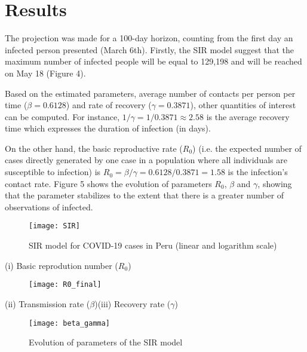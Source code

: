 \documentclass[12pt]{article}
\begin{document}
\section{Results}

The projection was made for a 100-day horizon, counting from the first day an infected person presented (March 6th). Firstly, the SIR model suggest that the maximum number of infected people will be equal to 129,198 and will be reached on May 18 (Figure 4).

Based on the estimated parameters, average number of contacts per person per time ($\beta=0.6128$) and  rate of recovery ($\gamma = 0.3871$), other quantities of interest can be computed. For instance, $1/\gamma = 1/0.3871 \approx  2.58$ is the average recovery time which expresses the duration of infection (in days). 

On the other hand, the basic reproductive rate ($R_0$) (i.e. the expected number of cases directly generated by one case in a population where all individuals are susceptible to infection) is $R_0=\beta/\gamma=0.6128/0.3871= 1.58$ is the infection’s contact rate. Figure 5 shows the evolution of parameters $R_0$, $\beta$ and $\gamma$, showing that the parameter stabilizes to the extent that there is a greater number of observations of infected.
\vspace{5mm}

\begin{figure}[h]
\centering
\texttt{[image: SIR]}
\caption{SIR model for COVID-19 cases in Peru (linear and logarithm scale)}
\end{figure}
\clearpage

\begin{flushleft}\centering (i) Basic reprodution number ($R_0$) \end{flushleft}\begin{figure}[h]
\centering
\texttt{[image: R0\_final]}
\end{figure}\begin{flushleft}\centering (ii) Transmission rate ($\beta$)\text{ }\text{ }\text{ }\text{ }\text{ }\text{ }\text{ }\text{ }\text{ }\text{ }\text{ }\text{ }\text{ }\text{ }\text{ }\text{ }\text{ }\text{ }\text{ }\text{ }\text{ }\text{ }\text{ }\text{ }\text{ }\text{ }\text{ }\text{ }\text{ }\text{ }\text{ }\text{ }(iii) Recovery rate ($\gamma$)  \end{flushleft}\begin{figure}[h]
\centering
\texttt{[image: beta\_gamma]}
\caption{Evolution of parameters of the SIR model}
\end{figure}
\end{document}
